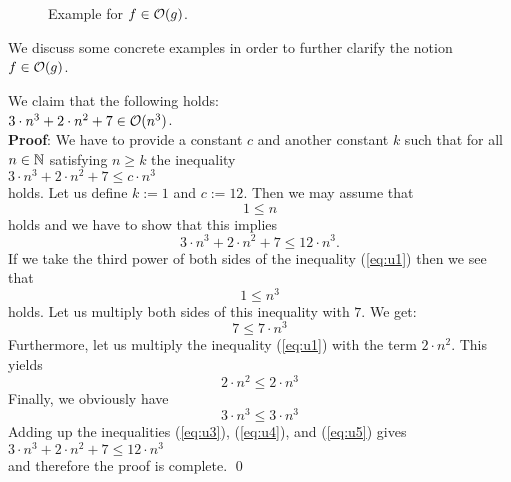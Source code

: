 \begin{figure}[!ht]
  \centering
  \caption{Example for $f \in \mathcal{O}(g)$.}
  \label{fig:big-o.eps}
\end{figure}


\noindent
We discuss some concrete examples in order to further clarify the notion $f \in \mathcal{O}(g)$.

\example
We claim that the following holds:
\\[0.2cm]
\hspace*{1.3cm}
$3 \cdot n^3 + 2 \cdot n^2 + 7 \in \mathcal{O}(n^3)$. 
\\[0.2cm]
\textbf{Proof}:  We have to  provide a constant $c$ and another constant $k$ such that for all $n\in
{\mathbb N}$ satisfying
$n \geq k$ the inequality
\\[0.2cm]
\hspace*{1.3cm} 
$3 \cdot n^3 + 2 \cdot n^2 + 7 \leq c \cdot n^3$
\\[0.2cm]
holds.  Let us define  $k := 1$ and $c := 12$.  Then we may assume that 
\begin{equation}
  \label{eq:u1}
  1\leq n  
\end{equation}
holds and we have to show that this implies 
\begin{equation}
  \label{eq:u2}
  3 \cdot n^3 + 2 \cdot n^2 + 7 \leq 12 \cdot n^3.
\end{equation}
If we take the third power of both sides of the inequality (\ref{eq:u1}) then we see that
\begin{equation}
  \label{eq:u3pre}
  1 \leq n^3  
\end{equation}
holds.  Let us multiply both sides of this inequality with $7$.  We get: 
\begin{equation}
  \label{eq:u3}
  7 \leq 7 \cdot n^3
\end{equation}
Furthermore, let us multiply the inequality (\ref{eq:u1}) with the term $2\cdot n^2$.  This yields
\begin{equation}
  \label{eq:u4}
  2 \cdot n^2 \leq 2 \cdot n^3  
\end{equation}
Finally, we obviously have
\begin{equation}
  \label{eq:u5}
  3 \cdot n^3 \leq 3 \cdot n^3
\end{equation}
Adding up the inequalities (\ref{eq:u3}), (\ref{eq:u4}), and (\ref{eq:u5}) gives \\[0.2cm]
\hspace*{1.3cm} $3 \cdot n^3 + 2 \cdot n^2 + 7 \leq 12 \cdot n^3$ \\[0.2cm]
and therefore the proof is complete. \qed

